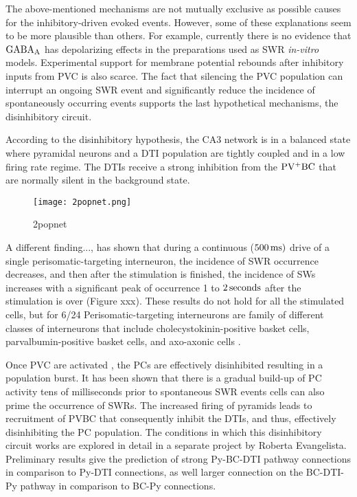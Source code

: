     The above-mentioned mechanisms are not mutually exclusive as possible
    causes for the inhibitory-driven evoked events. However, some of these
    explanations seem to be more plausible than others. For example, currently
    there is no evidence that $\rm GABA_A$ has depolarizing effects in the
    preparations used as SWR {\it in-vitro} models. Experimental support for membrane
    potential rebounds after inhibitory inputs from PVC is also scarce. The
    fact that silencing the PVC population can interrupt an ongoing SWR event and
    significantly reduce the incidence of spontaneously occurring events
    \citep{Schlingloff2014} supports the last hypothetical mechanisms, the
    disinhibitory circuit.

    According to the disinhibitory hypothesis, the CA3 network is in a balanced state where
    pyramidal neurons and a DTI population are tightly coupled  and in a low
    firing rate regime. The DTIs receive a strong inhibition from the
    $\rm PV^+BC$ that are normally silent in the background state. 
    
    \begin{figure}
      \center
      \texttt{[image: 2popnet.png]}
      \caption{
        2popnet
             }
    \label{fig:ca3only_SCsumm}
    \end{figure}

    A different finding..., \cite{Ellender2010} has shown that during
    a continuous ($500\, \rm ms)$ drive of a single perisomatic-targeting
    interneuron, the incidence of SWR occurrence decreases, and then after the
    stimulation is finished, the incidence of SWs increases with a significant
    peak of occurrence 1 to $2\,\rm seconds$ after the stimulation is over
    (Figure xxx). These results do not hold for all the stimulated cells, but for 6/24
    Perisomatic-targeting interneurons are family of different classes of
    interneurons that include cholecystokinin-positive basket cells,
    parvalbumin-positive basket cells, and axo-axonic cells \citep{Freund1996}.
    

    Once PVC are activated \citep{Ellender2010, Schlingloff2014}, the PCs are
    effectively disinhibited resulting in a population burst. It has been
    shown that there is a gradual build-up of PC activity tens of milliseconds
    prior to spontaneous SWR events %
    cells \citep{Baszelot2016} can also prime the occurrence of SWRs. The
    increased firing of pyramids leads to recruitment of PVBC that consequently
    inhibit the DTIs, and thus, effectively disinhibiting the PC population.
    The conditions in which this disinhibitory circuit works are explored in
    detail in a separate project by Roberta Evangelista. Preliminary results
    give the prediction of strong Py-BC-DTI pathway connections in comparison
    to Py-DTI connections, as well larger connection on the BC-DTI-Py pathway
    in comparison to BC-Py connections.

